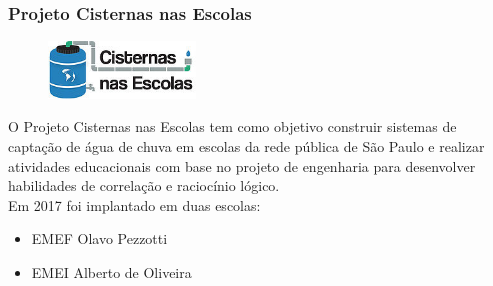 \documentclass{beamer}
\begin{document}
\begin{frame}
\frametitle{Projeto Cisternas nas Escolas}
\begin{minipage}{\textwidth}

	\begin{figure}
		\begin{center}
			\includegraphics[width=0.35\textwidth]{logo.jpg}
		\end{center}
		\vspace{+15pt}
	\end{figure}

	O Projeto Cisternas nas Escolas tem como objetivo construir sistemas de captação de água de chuva em escolas da rede pública de São Paulo e realizar atividades educacionais com base no projeto de engenharia para desenvolver habilidades de correlação e raciocínio lógico.\\
	
	Em 2017 foi implantado em duas escolas:
	\begin{itemize}
		\item EMEF Olavo Pezzotti 
		\item EMEI Alberto de Oliveira
	\end{itemize}

\end{minipage}
\end{frame}
\end{document}
